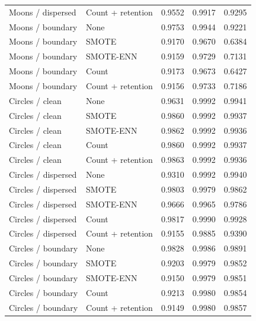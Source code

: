 \begin{table}[htbp]
\begin{tabular}{llrrr}
Moons / dispersed & Count + retention & 0.9552 & 0.9917 & 0.9295 \\
Moons / boundary & None & 0.9753 & 0.9944 & 0.9221 \\
Moons / boundary & SMOTE & 0.9170 & 0.9670 & 0.6384 \\
Moons / boundary & SMOTE-ENN & 0.9159 & 0.9729 & 0.7131 \\
Moons / boundary & Count & 0.9173 & 0.9673 & 0.6427 \\
Moons / boundary & Count + retention & 0.9156 & 0.9733 & 0.7186 \\
Circles / clean & None & 0.9631 & 0.9992 & 0.9941 \\
Circles / clean & SMOTE & 0.9860 & 0.9992 & 0.9937 \\
Circles / clean & SMOTE-ENN & 0.9862 & 0.9992 & 0.9936 \\
Circles / clean & Count & 0.9860 & 0.9992 & 0.9937 \\
Circles / clean & Count + retention & 0.9863 & 0.9992 & 0.9936 \\
Circles / dispersed & None & 0.9310 & 0.9992 & 0.9940 \\
Circles / dispersed & SMOTE & 0.9803 & 0.9979 & 0.9862 \\
Circles / dispersed & SMOTE-ENN & 0.9666 & 0.9965 & 0.9786 \\
Circles / dispersed & Count & 0.9817 & 0.9990 & 0.9928 \\
Circles / dispersed & Count + retention & 0.9155 & 0.9885 & 0.9390 \\
Circles / boundary & None & 0.9828 & 0.9986 & 0.9891 \\
Circles / boundary & SMOTE & 0.9203 & 0.9979 & 0.9852 \\
Circles / boundary & SMOTE-ENN & 0.9150 & 0.9979 & 0.9851 \\
Circles / boundary & Count & 0.9213 & 0.9980 & 0.9854 \\
Circles / boundary & Count + retention & 0.9149 & 0.9980 & 0.9857 \\
\hline
\end{tabular}
\end{table}
\clearpage

